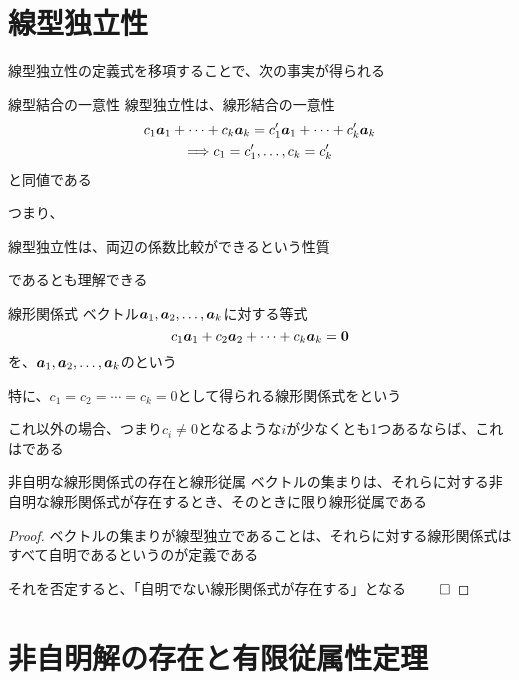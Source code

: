 \documentclass[../../../topic_linear-equation]{subfiles}
\begin{document}
\sectionline
\section{線型独立性}

線型独立性の定義式を移項することで、次の事実が得られる

\begin{theorem}{線型結合の一意性}
  線型独立性は、線形結合の一意性
  \begin{gather*}
    c_1 \vb*{a}_1 + \cdots + c_k \vb*{a}_k = c'_1 \vb*{a}_1 + \cdots + c'_k \vb*{a}_k \\ \Longrightarrow c_1 = c'_1, \dots, c_k = c'_k
  \end{gather*}
  と同値である
\end{theorem}

つまり、
\begin{shaded}
  線型独立性は、両辺の係数比較ができるという性質
\end{shaded}
であるとも理解できる

\sectionline

\begin{definition}{線形関係式}
  ベクトル$\vb*{a}_1, \vb*{a}_2, \dots, \vb*{a}_k$に対する等式
  \begin{equation*}
    c_1 \vb*{a}_1 + c_2 \vb*{a}_2 + \cdots + c_k \vb*{a}_k = \vb*{0}
  \end{equation*}
  を、$\vb*{a}_1, \vb*{a}_2, \dots, \vb*{a}_k$のという
\end{definition}

特に、$c_1 = c_2 = \cdots = c_k = 0$として得られる線形関係式をという

これ以外の場合、つまり$c_i \neq 0$となるような$i$が少なくとも1つあるならば、これはである

\begin{theorem}{非自明な線形関係式の存在と線形従属}
  ベクトルの集まりは、それらに対する非自明な線形関係式が存在するとき、そのときに限り線形従属である
\end{theorem}

\begin{proof}
  ベクトルの集まりが線型独立であることは、それらに対する線形関係式はすべて自明であるというのが定義である

  それを否定すると、「自明でない線形関係式が存在する」となる $\qed$
\end{proof}

\sectionline
\section{非自明解の存在と有限従属性定理}
\end{document}
